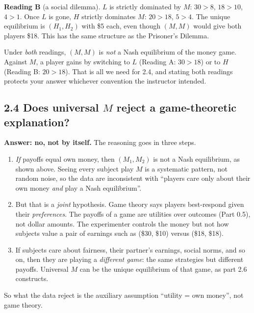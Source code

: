 \documentclass[11pt]{article}
\begin{document}
\textbf{Reading B} (a social dilemma). $L$ is strictly dominated by $M$: $30>8$, $18>10$, $4>1$. Once $L$ is gone, $H$ strictly dominates $M$: $20>18$, $5>4$. The unique equilibrium is $(H_1,H_2)$ with \$5 each, even though $(M,M)$ would give both players \$18. This has the same structure as the Prisoner's Dilemma.

Under \emph{both} readings, $(M,M)$ is \emph{not} a Nash equilibrium of the money game. Against $M$, a player gains by switching to $L$ (Reading A: $30>18$) or to $H$ (Reading B: $20>18$). That is all we need for 2.4, and stating both readings protects your answer whichever convention the instructor intended.

\subsection*{2.4 Does universal $M$ reject a game-theoretic explanation?}
\textbf{Answer: no, not by itself.} The reasoning goes in three steps.
\begin{enumerate}
\item \emph{If} payoffs equal own money, then $(M_1,M_2)$ is not a Nash equilibrium, as shown above. Seeing every subject play $M$ is a systematic pattern, not random noise, so the data are inconsistent with ``players care only about their own money \emph{and} play a Nash equilibrium''.
\item But that is a \emph{joint} hypothesis. Game theory says players best-respond given their \emph{preferences}. The payoffs of a game are utilities over outcomes (Part 0.5), not dollar amounts. The experimenter controls the money but not how subjects value a pair of earnings such as (\$30, \$10) versus (\$18, \$18).
\item If subjects care about fairness, their partner's earnings, social norms, and so on, then they are playing a \emph{different game}: the same strategies but different payoffs. Universal $M$ can be the unique equilibrium of that game, as part 2.6 constructs.
\end{enumerate}
So what the data reject is the auxiliary assumption ``utility = own money'', not game theory.
\end{document}
